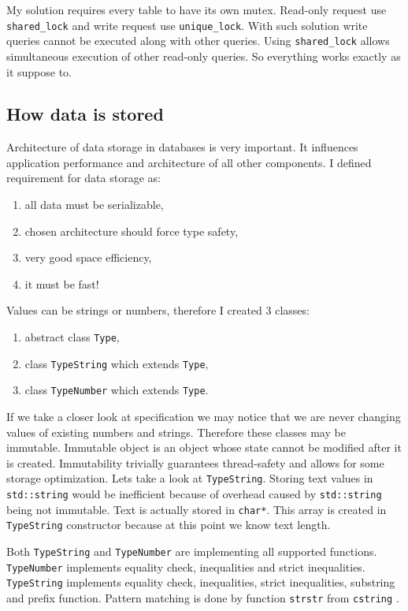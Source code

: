 \documentclass[10pt,a4paper]{article}
\begin{document}
My solution requires every table to have its own mutex. Read-only request use \verb|shared_lock| and write request use \verb|unique_lock|. With such solution write queries cannot be executed along with other queries. Using \verb|shared_lock| allows simultaneous execution of other read-only queries. So everything works exactly as it suppose to.

\subsection{How data is stored}

Architecture of data storage in databases is very important. It influences application performance and architecture of all other components. I defined requirement for data storage as: 
\begin{enumerate}
\item all data must be serializable,
\item chosen architecture should force type safety,
\item very good space efficiency,
\item it must be fast!
\end{enumerate}
Values can be strings or numbers, therefore I created 3 classes:
\begin{enumerate}
\item abstract class \verb|Type|,
\item class \verb|TypeString| which extends \verb|Type|,
\item class \verb|TypeNumber| which extends \verb|Type|.
\end{enumerate}

If we take a closer look at specification we may notice that we are never changing values of existing numbers and strings. Therefore these classes may be immutable. Immutable object is an object whose state cannot be modified after it is created. Immutability trivially guarantees thread-safety and allows for some storage optimization. Lets take a look at \verb|TypeString|. Storing text values in \verb|std::string| would be inefficient because of overhead caused by \verb|std::string| being not immutable. Text is actually stored in \verb|char*|. This array is created in \verb|TypeString| constructor because at this point we know text length.   

Both \verb|TypeString| and \verb|TypeNumber| are implementing all supported functions. \verb|TypeNumber| implements equality check, inequalities and strict inequalities. \verb|TypeString| implements equality check, inequalities, strict inequalities, substring and prefix function. Pattern matching is done by function \verb|strstr| from \verb|cstring| \cite{STRSTR}.
\end{document}
